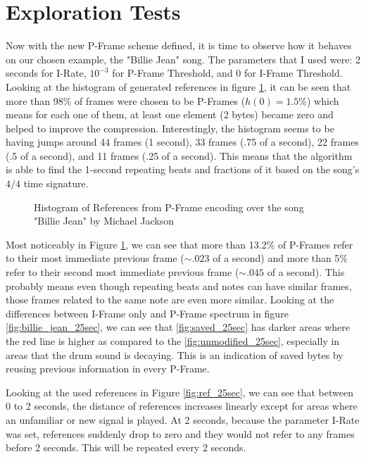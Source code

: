 \section{Exploration Tests}
\label{sec:tests}

Now with the new P-Frame scheme defined, it is time to observe how it behaves on our chosen example, the "Billie Jean" song. The parameters that I used were: 2 seconds for I-Rate, $10^{-3}$ for P-Frame Threshold, and 0 for I-Frame Threshold. Looking at the histogram of generated references in figure \ref{fig:hist}, it can be seen that more than 98\% of frames were chosen to be P-Frames ($h(0)=1.5\%$) which means for each one of them, at least one element (2 bytes) became zero and helped to improve the compression. Interestingly, the histogram seems to be having jumps around 44 frames (1 second), 33 frames (.75 of a second), 22 frames (.5 of a second), and 11 frames (.25 of a second). This means that the algorithm is able to find the 1-second repeating beats and fractions of it based on the song's $4/4$ time signature. 

\begin{figure}[ht] 
    \centering
    
    \caption{Histogram of References from P-Frame encoding over the song "Billie Jean" by Michael Jackson}
    \label{fig:hist}
\end{figure}

Most noticeably in Figure \ref{fig:hist}, we can see that more than 13.2\% of P-Frames refer to their most immediate previous frame ($\sim .023$ of a second) and more than 5\% refer to their second most immediate previous frame ($\sim .045$ of a second). This probably means even though repeating beats and notes can have similar frames, those frames related to the same note are even more similar. Looking at the differences between I-Frame only and P-Frame spectrum in figure \ref{fig:billie_jean_25sec}, we can see that \ref{fig:saved_25sec} has darker areas where the red line is higher as compared to the \ref{fig:unmodified_25sec}, especially in areas that the drum sound is decaying. This is an indication of saved bytes by reusing previous information in every P-Frame.

Looking at the used references in Figure \ref{fig:ref_25sec}, we can see that between 0 to 2 seconds, the distance of references increases linearly except for areas where an unfamiliar or new signal is played. At 2 seconds, because the parameter I-Rate was set, references suddenly drop to zero and they would not refer to any frames before 2 seconds. This will be repeated every 2 seconds.

